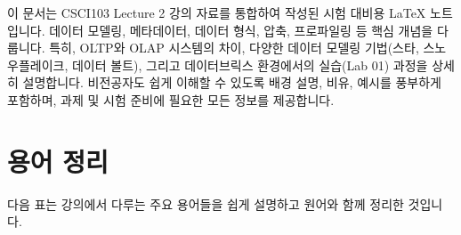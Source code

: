 \documentclass[11pt,a4paper]{article}
\begin{document}
\begin{tcolorbox}[mybox, title=개요]
이 문서는 CSCI103 Lecture 2 강의 자료를 통합하여 작성된 시험 대비용 LaTeX 노트입니다.
데이터 모델링, 메타데이터, 데이터 형식, 압축, 프로파일링 등 핵심 개념을 다룹니다.
특히, OLTP와 OLAP 시스템의 차이, 다양한 데이터 모델링 기법(스타, 스노우플레이크, 데이터 볼트), 그리고 데이터브릭스 환경에서의 실습(Lab 01) 과정을 상세히 설명합니다.
비전공자도 쉽게 이해할 수 있도록 배경 설명, 비유, 예시를 풍부하게 포함하며, 과제 및 시험 준비에 필요한 모든 정보를 제공합니다.
\end{tcolorbox}

\newpage
\section{용어 정리}

다음 표는 강의에서 다루는 주요 용어들을 쉽게 설명하고 원어와 함께 정리한 것입니다.
\end{document}
